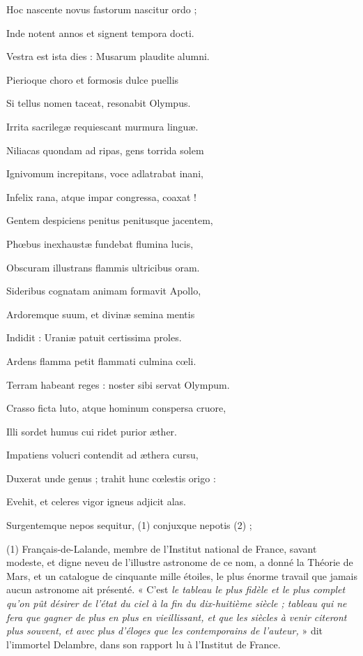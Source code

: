 \documentclass[11pt,a4paper]{article}
\begin{document}
Hoc nascente novus fastorum nascitur ordo ;

Inde notent annos et signent tempora docti.

Vestra est ista dies : Musarum plaudite alumni.

Pierioque choro et formosis dulce puellis

Si tellus nomen taceat, resonabit Olympus.

Irrita sacrilegæ requiescant murmura linguæ.

Niliacas quondam ad ripas, gens torrida solem

Ignivomum increpitans, voce adlatrabat inani,

Infelix rana, atque impar congressa, coaxat !

Gentem despiciens penitus penitusque jacentem,

Phœbus inexhaustæ fundebat flumina lucis,

Obscuram illustrans flammis ultricibus oram.

Sideribus cognatam animam formavit Apollo,

Ardoremque suum, et divinæ semina mentis

Indidit : Uraniæ patuit certissima proles.

Ardens flamma petit flammati culmina cœli.

Terram habeant reges : noster sibi servat Olympum.

Crasso ficta luto, atque hominum conspersa cruore,

Illi sordet humus cui ridet purior æther.

Impatiens volucri contendit ad æthera cursu,

Duxerat unde genus ; trahit hunc cœlestis origo :

Evehit, et celeres vigor igneus adjicit alas.

Surgentemque nepos sequitur, (1) conjuxque nepotis (2) ;


(1) Français-de-Lalande, membre de l'Institut national de France, savant modeste, et digne neveu de l'illustre astronome de ce nom, a donné la Théorie de Mars, et un catalogue de cinquante mille étoiles, le plus énorme travail que jamais aucun astronome ait présenté. « C'est \emph{le tableau le plus fidèle et le plus complet qu'on pût désirer de l'état du ciel à la fin du dix-huitième siècle ; tableau qui ne fera que gagner de plus en plus en vieillissant, et que les siècles à venir citeront plus souvent, et avec plus d'éloges que les contemporains de l'auteur,} » dit l'immortel Delambre, dans son rapport lu à l'Institut de France.
\end{document}
